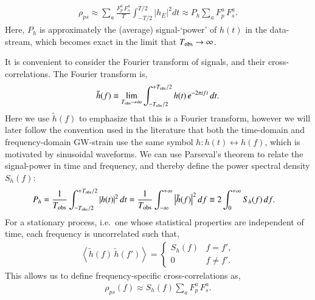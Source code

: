 \documentclass[onecolumn,authoryear]{els-mrw}
\begin{document}
\begin{align}\label{eq:redshift-correlation-approx}
    \rho_{ps} \approx \sum_a \frac{F^a_p \, F^a_s}{T} \int_{-T/2}^{T/2} \big| h_{E} \big|^2 dt \approx P_h \sum_a F^a_p \, F^a_s.
\end{align}
Here, $P_h$ is approximately the (average) signal-`power' of $h(t)$ in the data-stream, which becomes exact in the limit that $T_{\textrm{obs}} \rightarrow \infty$.

It is convenient to consider the Fourier transform of signals, and their cross-correlations.  The Fourier transform is,
\begin{align}\label{eq:fourier-transform}
    \tilde{h}(f) \equiv \lim_{T_{\textrm{obs}}\rightarrow \infty} \int_{-T_{\textrm{obs}}/2}^{+T_{\textrm{obs}}/2} h(t) \, e^{-2 \pi i f t} \, d t.
\end{align}
Here we use $\tilde{h}(f)$ to emphasize that this is a Fourier transform, however we will later follow the convention used in the literature that both the time-domain and frequency-domain GW-strain use the same symbol $h: h(t) \leftrightarrow h(f)$, which is motivated by sinusoidal waveforms.  We can use Parseval's theorem to relate the signal-power in time and frequency, and thereby define the power spectral density $S_h(f)$:
\begin{align}\label{eq:psd_fourier}
    P_h & = \frac{1}{T_{\textrm{obs}}} \int_{-T_{\textrm{obs}}/2}^{+T_{\textrm{obs}}/2} \left| h(t) \right|^2 dt = \frac{1}{T_{\textrm{obs}}} \int_{-\infty}^{+\infty} \left| \tilde{h}(f) \right|^2 df \equiv 2 \int_{0}^{+\infty} S_h(f) \, df.
\end{align}
For a stationary process, i.e.~one whose statistical properties are independent of time, each frequency is uncorrelated such that,
\begin{align}
    \left< \tilde{h}(f) \, \tilde{h}(f') \right> =
    \begin{cases}
        S_h(f) & f = f', \\
        0      & f \neq f'.
    \end{cases}
\end{align}
This allows us to define frequency-specific cross-correlations as,
\begin{align}\label{eq:redshift-correlation-frequency}
    \rho_{ps}(f) \approx S_h(f) \sum_a F^a_p \, F^a_s.
\end{align}
\end{document}
